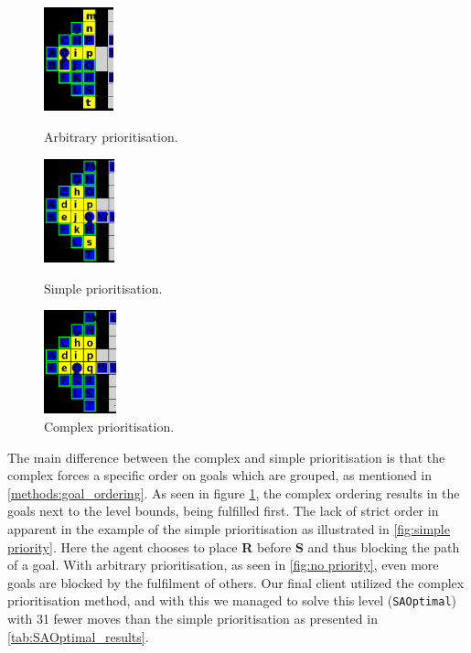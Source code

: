 \begin{figure}[h!]
  \centering
  \begin{minipage}{.30\columnwidth}
    \centering
    \includegraphics[height=3cm]{graphics/no_priority_block.png}
    \caption{\label{fig:no priority}Arbi\-tra\-ry prioritisation.}
  \end{minipage}%
  \hspace{10pt}%
  \begin{minipage}{.30\columnwidth}
    \centering
    \includegraphics[height=3cm]{graphics/simple_priority_block.PNG}
    \caption{\label{fig:simple priority}Simple prioritisation.}
  \end{minipage}%
  \hspace{10pt}%
  \begin{minipage}{.30\columnwidth}
    \centering
    \includegraphics[height=3cm]{graphics/complex_priority.png}
    \caption{\label{fig:complex_priority}Comp\-lex prioritisation.}
  \end{minipage}
\end{figure}

The main difference between the complex and simple prioritisation is that the complex forces a specific order on goals which are grouped, as mentioned in \cref{methods:goal_ordering}.
As seen in figure \cref{fig:complex_priority}, the complex ordering results in the goals next to the level bounds, being fulfilled first. 
The lack of strict order in apparent in the example of the simple prioritisation as illustrated in \cref{fig:simple priority}. Here the agent chooses to place \textbf{R} before \textbf{S} and thus blocking the path of a goal.
With arbitrary prioritisation, as seen in \cref{fig:no priority}, even more goals are blocked by the fulfilment of others.
Our final client utilized the complex prioritisation method, and with this we managed to solve this level (\texttt{SAOptimal}) with 31 fewer moves than the simple prioritisation as presented in \cref{tab:SAOptimal_results}.

